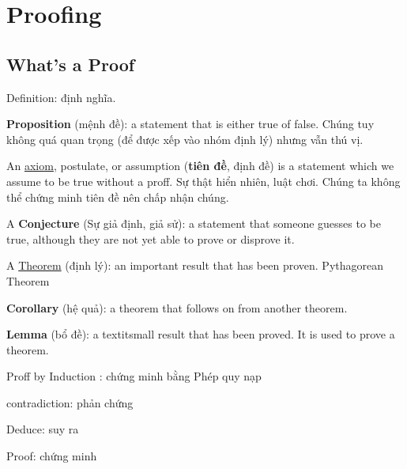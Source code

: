 
\chapter{Proofing}

\section{What's a Proof}

Definition: định nghĩa.

\textbf{Proposition} (mệnh đề): a statement that is either true of false. Chúng tuy không quá quan trọng (để được xếp vào nhóm định lý) nhưng vẫn thú vị.

An \href{https://en.wikipedia.org/wiki/Axiom}{axiom}, postulate, or assumption (\textbf{tiên đề}, định đề) is a statement which we assume to be true without a proff. Sự thật hiển nhiên, luật chơi. Chúng ta không thể chứng minh tiên đề nên chấp nhận chúng.

A \textbf{Conjecture} (Sự giả định, giả sử): a statement that someone guesses to be true, although they are not yet able to prove or disprove it.

A \href{https://en.wikipedia.org/wiki/Theorem}{Theorem} (định lý): an important result that has been proven. Pythagorean Theorem

\textbf{Corollary} (hệ quả): a theorem that follows on from another theorem.

\textbf{Lemma} (bổ đề): a textit{small} result that has been proved. It is used to prove a theorem.

Proff by Induction : chứng minh bằng Phép quy nạp

contradiction: phản chứng

Deduce: suy ra

Proof: chứng minh

